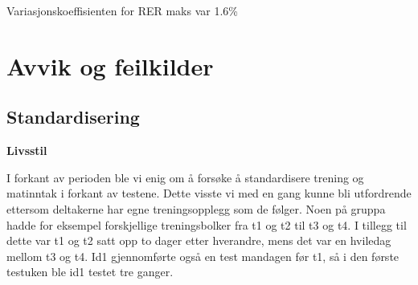 \documentclass[
  letterpaper,
  DIV=11,
  numbers=noendperiod]{scrreprt}
\newenvironment{Shaded}{\begin{snugshade}}{\end{snugshade}}
\newcommand{\AttributeTok}[1]{\textcolor[rgb]{0.40,0.45,0.13}{#1}}
\newcommand{\CommentTok}[1]{\textcolor[rgb]{0.37,0.37,0.37}{#1}}
\newcommand{\ConstantTok}[1]{\textcolor[rgb]{0.56,0.35,0.01}{#1}}
\newcommand{\DecValTok}[1]{\textcolor[rgb]{0.68,0.00,0.00}{#1}}
\newcommand{\FunctionTok}[1]{\textcolor[rgb]{0.28,0.35,0.67}{#1}}
\newcommand{\NormalTok}[1]{\textcolor[rgb]{0.00,0.23,0.31}{#1}}
\newcommand{\OtherTok}[1]{\textcolor[rgb]{0.00,0.23,0.31}{#1}}
\newcommand{\SpecialCharTok}[1]{\textcolor[rgb]{0.37,0.37,0.37}{#1}}
\begin{document}
\begin{Shaded}
\end{Shaded}

Variasjonskoeffisienten for RER maks var 1.6\%

\section{Avvik og feilkilder}\label{avvik-og-feilkilder}

\subsection{Standardisering}\label{standardisering-1}

\textbf{Livsstil}

I forkant av perioden ble vi enig om å forsøke å standardisere trening
og matinntak i forkant av testene. Dette visste vi med en gang kunne bli
utfordrende ettersom deltakerne har egne treningsopplegg som de følger.
Noen på gruppa hadde for eksempel forskjellige treningsbolker fra t1 og
t2 til t3 og t4. I tillegg til dette var t1 og t2 satt opp to dager
etter hverandre, mens det var en hviledag mellom t3 og t4. Id1
gjennomførte også en test mandagen før t1, så i den første testuken ble
id1 testet tre ganger.
\end{document}
